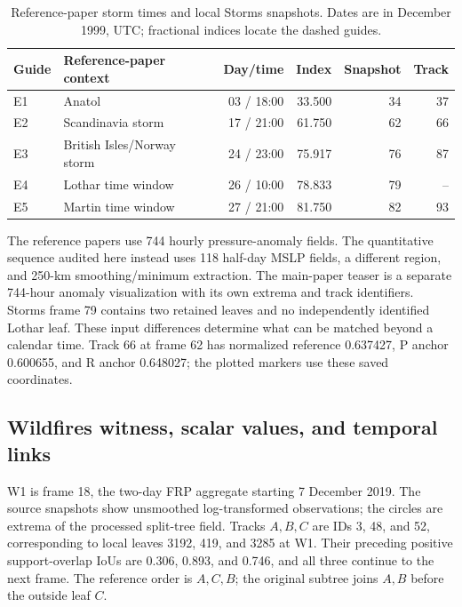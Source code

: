 \begin{table}[H]\centering\small
\caption{Reference-paper storm times and local Storms snapshots. Dates are in December 1999, UTC; fractional indices locate the dashed guides.}\label{tab:s_era_event_times}
\setlength{\tabcolsep}{5pt}
\begin{tabular}{llrrrr}\toprule
Guide & Reference-paper context & Day/time & Index & Snapshot & Track\\\midrule
E1 & Anatol & 03 / 18:00 & 33.500 & 34 & 37\\
E2 & Scandinavia storm & 17 / 21:00 & 61.750 & 62 & 66\\
E3 & British Isles/Norway storm & 24 / 23:00 & 75.917 & 76 & 87\\
E4 & Lothar time window & 26 / 10:00 & 78.833 & 79 & --\\
E5 & Martin time window & 27 / 21:00 & 81.750 & 82 & 93\\
\bottomrule\end{tabular}\end{table}

The reference papers use 744 hourly pressure-anomaly fields. The quantitative sequence audited here instead uses 118 half-day MSLP fields, a different region, and 250-km smoothing/minimum extraction. The main-paper teaser is a separate 744-hour anomaly visualization with its own extrema and track identifiers. Storms frame 79 contains two retained leaves and no independently identified Lothar leaf. These input differences determine what can be matched beyond a calendar time. Track 66 at frame 62 has normalized reference 0.637427, P anchor 0.600655, and R anchor 0.648027; the plotted markers use these saved coordinates.

\subsection{Wildfires witness, scalar values, and temporal links}
W1 is frame 18, the two-day FRP aggregate starting 7 December 2019. The source snapshots show unsmoothed log-transformed observations; the circles are extrema of the processed split-tree field. Tracks $A,B,C$ are IDs 3, 48, and 52, corresponding to local leaves 3192, 419, and 3285 at W1. Their preceding positive support-overlap IoUs are 0.306, 0.893, and 0.746, and all three continue to the next frame. The reference order is $A,C,B$; the original subtree joins $A,B$ before the outside leaf $C$.

